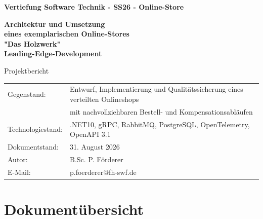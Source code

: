 \documentclass[10pt,a4paper]{article}
\begin{document}
\begin{titlepage}
  \thispagestyle{empty}

  \vspace*{8mm}
  {\color{white}\sffamily\bfseries\fontsize{15}{18}\selectfont
    Vertiefung Software Technik - SS26 - Online-Store\par}
  \vspace{22mm}

  {\sffamily\bfseries\color{Primary}\fontsize{28}{33}\selectfont
    Architektur und Umsetzung\\ 
	eines exemplarischen Online-Stores\\ 
	"Das Holzwerk" \\ 
	Leading-Edge-Development\par}
  \vspace{5mm}
  {\sffamily\color{Muted}\Large
    Projektbericht\par}

\vfill
  \begin{tabular}{ll}
	Gegenstand: 		& Entwurf, Implementierung und Qualitätssicherung eines verteilten Onlineshops\\
						& mit nachvollziehbaren Bestell- und Kompensationsabläufen\\
	Technologiestand: 	& .NET10, gRPC, RabbitMQ, PostgreSQL, OpenTelemetry, OpenAPI 3.1\\
    Dokumentstand: 		& 31. August 2026\\    
	Autor: 				&	B.Sc. P. Förderer\\
	E-Mail:				&	p.foerderer@fh-swf.de\\
\end{tabular}
\vspace{15mm}
\end{titlepage}

\setcounter{page}{2}

\section*{Dokumentübersicht}
\end{document}
